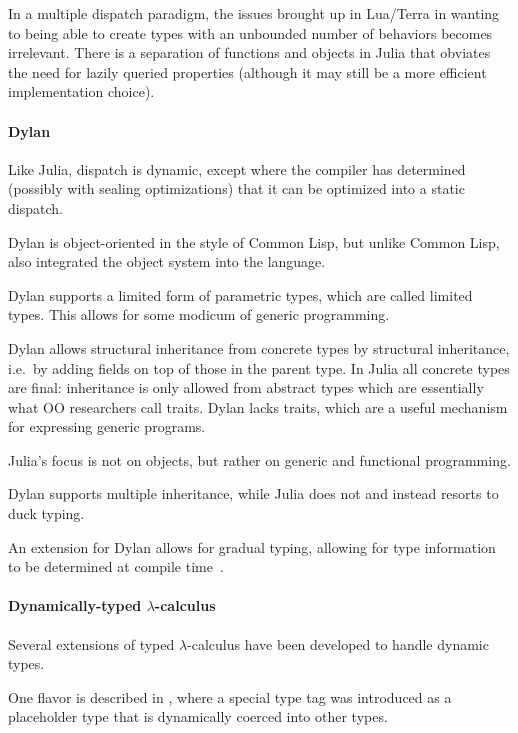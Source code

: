 \documentclass[pldi]{sigplanconf-pldi15}
\begin{document}

In a multiple dispatch paradigm, the issues brought up in Lua/Terra in wanting
to being able to create types with an unbounded number of behaviors becomes
irrelevant. There is a separation of functions and objects in Julia that
obviates the need for lazily queried properties (although it may still be a
more efficient implementation choice).

\paragraph{Dylan}

Like Julia, dispatch is dynamic, except where the compiler has determined
(possibly with sealing optimizations) that it can be optimized into a static
dispatch.

Dylan is object-oriented in the style of Common Lisp, but unlike Common Lisp,
also integrated the object system into the language.

Dylan supports a limited form of parametric types, which are called limited
types.\cite{dylanman} This allows for some modicum of generic programming.

Dylan allows structural inheritance from concrete types by structural
inheritance, i.e.\ by adding fields on top of those in the parent type. In
Julia all concrete types are final: inheritance is only allowed from abstract
types which are essentially what OO researchers call traits. Dylan lacks
traits, which are a useful mechanism for expressing generic programs.

Julia's focus is not on objects, but rather on generic and functional
programming.

Dylan supports multiple inheritance, while Julia does not and instead resorts
to duck typing.

An extension for Dylan allows for gradual typing, allowing for type information
to be determined at compile time~\cite{Mehnert2010}.

\paragraph{Dynamically-typed $\lambda$-calculus}

Several extensions of typed $\lambda$-calculus have been developed to handle
dynamic types.

One flavor is described in \cite{Henglein1994}, where a special type tag
 was introduced as a placeholder type that is dynamically coerced
into other types. %
\end{document}
